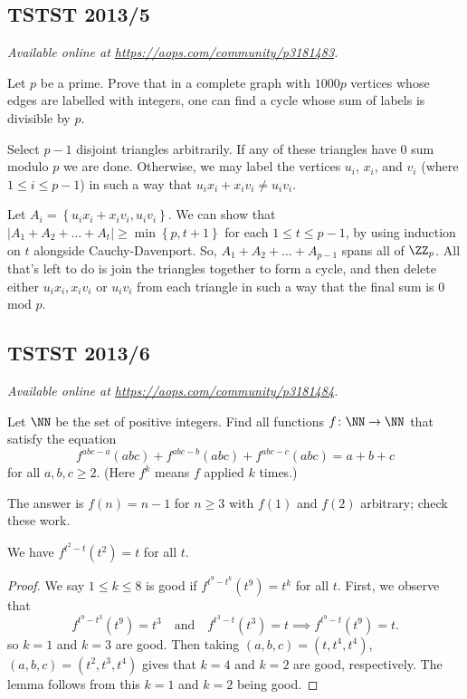 \documentclass[11pt]{scrartcl}
\begin{document}
\subsection{TSTST 2013/5}
\textsl{Available online at \url{https://aops.com/community/p3181483}.}
\begin{mdframed}[style=mdpurplebox,frametitle={Problem statement}]
Let $p$ be a prime.
Prove that in a complete graph with $1000p$ vertices
whose edges are labelled with integers,
one can find a cycle whose sum of labels is divisible by $p$.
\end{mdframed}
Select $p-1$ disjoint triangles arbitrarily.  If any of these triangles have $0$ sum modulo $p$ we are done.  Otherwise, we may label the vertices $u_i$, $x_i$, and $v_i$ (where $1 \le i \le p-1$) in such a way that $u_ix_i + x_iv_i \neq u_iv_i$.

Let $A_i = \left\{ u_ix_i+x_iv_i, u_iv_i \right\}$.  We can show that $\left\lvert A_1 + A_2 + \dots + A_t \right\rvert \ge \min \left\{ p,t+1 \right\}$ for each $1 \le t \le p-1$, by using induction on $t$ alongside Cauchy-Davenport.  So, $A_1 + A_2 + \dots + A_{p-1}$ spans all of $\ZZ_p$.  All that's left to do is join the triangles together to form a cycle, and then delete either $u_ix_i,x_iv_i$ or $u_iv_i$ from each triangle in such a way that the final sum is $0$ mod $p$.
\pagebreak

\subsection{TSTST 2013/6}
\textsl{Available online at \url{https://aops.com/community/p3181484}.}
\begin{mdframed}[style=mdpurplebox,frametitle={Problem statement}]
Let $\NN$ be the set of positive integers.
Find all functions $f \colon \NN \to \NN$ that satisfy the equation
\[ f^{abc-a}(abc) + f^{abc-b}(abc) + f^{abc-c}(abc) = a + b + c \]
for all $a,b,c \ge 2$. (Here $f^k$ means $f$ applied $k$ times.)
\end{mdframed}
The answer is $f(n) = n-1$ for $n \ge 3$ with $f(1)$ and $f(2)$ arbitrary;
check these work.

\begin{lemma*}
 We have $f^{t^2-t}(t^2) = t$ for all $t$.
\end{lemma*}
\begin{proof}
 We say $1 \le k \le 8$ is good if $f^{t^9-t^k}(t^9) = t^k$ for all $t$.
 First, we observe that
 \[ f^{t^9-t^3}(t^9) = t^3 \quad\text{and}\quad f^{t^3-t}(t^3) = t
   \implies f^{t^9-t}(t^9) = t.  \]
 so $k=1$ and $k=3$ are good.
 Then taking $(a,b,c) = (t,t^4,t^4)$,
 $(a,b,c) = (t^2, t^3, t^4)$
 gives that $k = 4$ and $k = 2$ are good, respectively.
 The lemma follows from this $k=1$ and $k=2$ being good.
\end{proof}
\end{document}
